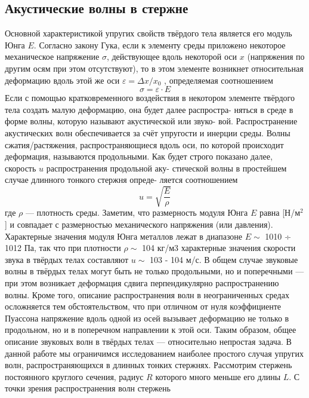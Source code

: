 \documentclass[a4paper, 10pt, twocolumn]{article}
\begin{document}
\subsection{Акустические волны в стержне}
Основной характеристикой упругих свойств твёрдого тела является его модуль Юнга $E$. Согласно закону 
Гука, если к элементу среды приложено некоторое механическое напряжение $\sigma$, действующее вдоль 
некоторой оси $x$ (напряжения по другим осям при этом отсутствуют), то в этом элементе возникнет 
относительная деформацию вдоль этой же оси
$\varepsilon = \Delta x/x_0$ , определяемая соотношением
\begin{equation}
\sigma = \varepsilon \cdot E
\end{equation}
Если с помощью кратковременного воздействия в некотором элементе
твёрдого тела создать малую деформацию, она будет далее распростра-
няться в среде в форме волны, которую называют акустической или звуко-
вой. Распространение акустических волн обеспечивается за счёт упругости
и инерции среды. Волны сжатия/растяжения, распространяющиеся вдоль
оси, по которой происходит деформация, называются продольными. Как
будет строго показано далее, скорость $u$ распространения продольной аку-
стической волны в простейшем случае длинного тонкого стержня опреде-
ляется соотношением
\begin{equation}
u = \sqrt{\frac{E}{\rho}}
\end{equation}
где $\rho$ — плотность среды.
Заметим, что размерность модуля Юнга $E$ равна [Н/м$^2$] и совпадает с
размерностью механического напряжения (или давления). Характерные
значения модуля Юнга металлов лежат в диапазоне $E\sim$ 1010 ÷ 1012 Па, так
что при плотности $\rho\sim$ 104 кг/м3 характерные значения скорости звука в
твёрдых телах составляют $u\sim$ 103 - 104 м/с.
В общем случае звуковые волны в твёрдых телах могут быть не только
продольными, но и поперечными — при этом возникает деформация сдвига
перпендикулярно распространению волны. Кроме того, описание распространения волн в неограниченных средах осложняется тем
обстоятельством, что при отличном от нуля коэффициенте Пуассона напряжение вдоль одной из осей вызывает деформацию не только в продольном,
 но и в поперечном направлении к этой оси. Таким образом, общее
описание звуковых волн в твёрдых телах — относительно непростая задача.
В данной работе мы ограничимся исследованием наиболее простого случая
упругих волн, распространяющихся в длинных тонких стержнях.
Рассмотрим стержень постоянного круглого сечения, радиус $R$ которого
много меньше его длины $L$. С точки зрения распространения волн стержень
\end{document}
